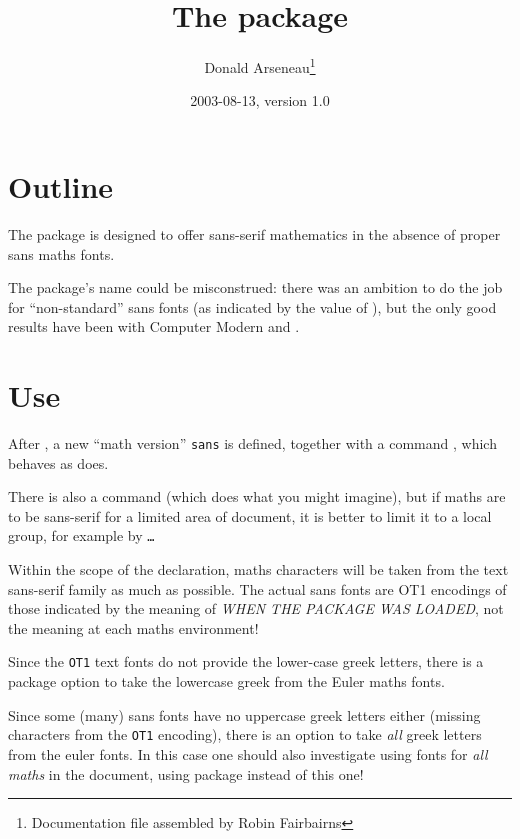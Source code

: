 \documentclass[a4paper]{article}
\begin{document}
\title{The  package}
\author{Donald Arseneau\thanks{Documentation file assembled by Robin
    Fairbairns}}
\date{2003-08-13, version 1.0}
\maketitle

\section{Outline}
The package is designed to offer sans-serif mathematics in the absence
of proper sans maths fonts.

The package's name could be misconstrued: there was an ambition to
do the job for ``non-standard'' sans fonts (as indicated by the value
of ), but the only good results have been with Computer
Modern and .

\section{Use}

After , a new ``math version''
\texttt{sans} is defined, together with a command , which
behaves as  does.

There is also a command  (which does what you might
imagine), but if maths are to be sans-serif for a limited area of
document, it is better to limit it to a local group, for example by
 \texttt{\dots} 

Within the scope of the  declaration, maths characters
will be taken from the text sans-serif family as much as possible.
The actual sans fonts are OT1 encodings of those indicated by the 
meaning of  \emph{WHEN THE PACKAGE WAS LOADED}, not the
meaning at each maths environment!

Since the \texttt{OT1} text fonts do not provide the lower-case greek letters,
there is a package option \option[eulergreek] to take the lowercase
greek from the Euler maths fonts.

Since some (many) sans fonts have no uppercase greek letters either
(missing characters from the \texttt{OT1} encoding), there is an
option \option[EULERGREEK] to take \emph{all} greek letters from the
euler fonts.  In this case one should also investigate using
 fonts for \emph{all maths} in the document, using
package  instead of this one!
\end{document}
